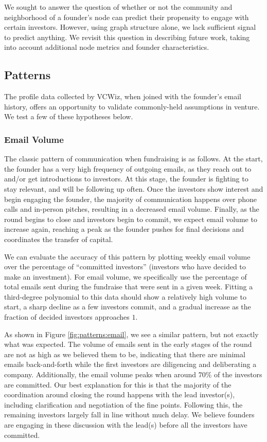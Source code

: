 We sought to answer the question of whether or not the community and neighborhood of a founder's node can predict their propensity to engage with certain investors. However, using graph structure alone, we lack sufficient signal to predict anything. We revisit this question in describing future work, taking into account additional node metrics and founder characteristics.

\subsection{Patterns}

The profile data collected by VCWiz, when joined with the founder's email history, offers an opportunity to validate commonly-held assumptions in venture. We test a few of these hypotheses below.

\subsubsection{Email Volume}

The classic pattern of communication when fundraising is as follows. At the start, the founder has a very high frequency of outgoing emails, as they reach out to and/or get introductions to investors. At this stage, the founder is fighting to stay relevant, and will be following up often. Once the investors show interest and begin engaging the founder, the majority of communication happens over phone calls and in-person pitches, resulting in a decreased email volume. Finally, as the round begins to close and investors begin to commit, we expect email volume to increase again, reaching a peak as the founder pushes for final decisions and coordinates the transfer of capital.

We can evaluate the accuracy of this pattern by plotting weekly email volume over the percentage of ``committed investors'' (investors who have decided to make an investment). For email volume, we specifically use the percentage of total emails sent during the fundraise that were sent in a given week. Fitting a third-degree polynomial to this data should show a relatively high volume to start, a sharp decline as a few investors commit, and a gradual increase as the fraction of decided investors approaches $1$.

As shown in Figure \ref{fig:patterns:email}, we see a similar pattern, but not exactly what was expected. The volume of emails sent in the early stages of the round are not as high as we believed them to be, indicating that there are minimal emails back-and-forth while the first investors are diligencing and deliberating a company. Additionally, the email volume peaks when around $70\%$ of the investors are committed. Our best explanation for this is that the majority of the coordination around closing the round happens with the lead investor(s), including clarification and negotiation of the fine points. Following this, the remaining investors largely fall in line without much delay. We believe founders are engaging in these discussion with the lead(s) before all the investors have committed.

